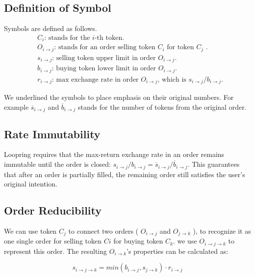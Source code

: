 \documentclass[UTF8,nofonts]{article}
\begin{document}
\subsection{Definition of Symbol}

Symbols are defined as follows.
\[
\begin{split}
&C_{i}\text{: \ }\text{stands for the $i$-th token.}\\
&O_{i\rightarrow j}\text{: \ }\text{stands for an order selling token $C_{i}$ for token $C_{j}$ .}\\
&s_{i\rightarrow j}\text{: \ }\text{selling token upper limit in order $O_{i\rightarrow j}$.}\\
&b_{i\rightarrow j}\text{: \ }\text{buying token lower limit in order $O_{i\rightarrow j}$.}\\
&r_{i\rightarrow j}\text{: \ }\text{max exchange rate in order $O_{i\rightarrow j}$, which is $s_{i\rightarrow j} / b_{i\rightarrow j}$.}
\end{split}
\]


We underlined the symbols to place emphasis on their original numbers. For example $\overline{s}_{i\rightarrow j}$ and $\overline{b}_{i\rightarrow j}$ stands for the number of tokens from the original order.

\subsection{Rate Immutability\label{sec: consistrate}}

Loopring requires that the max-return exchange rate in an order remains immutable until the order is closed: 
$s_{i\rightarrow j} / b_{i\rightarrow j} = \overline{s}_{i\rightarrow j}/ \overline{b}_{i\rightarrow j}$. This guarantees that after an order is partially filled, the remaining order still satisfies the user's original intention.

\subsection{Order Reducibility\label{sec: reducibility}}


We can use token $C_j$ to connect two orders ( $O_{i\rightarrow j}$ and $O_{j\rightarrow k}$ ), to recognize it as one single order for selling token $Ci$ for buying token $C_k$. we use $O_{i\rightarrow j\rightarrow k}$ to represent this order. The resulting $O_{i\rightarrow k}$'s properties can be calculated as: 

\begin{equation}
s_{i\rightarrow j\rightarrow k}=min(b_{i\rightarrow j}, s_{j\rightarrow k}) \cdot r_{i\rightarrow j}
\end{equation}
\end{document}
